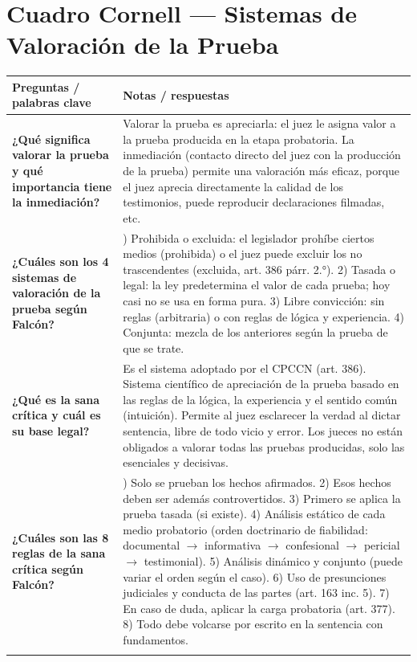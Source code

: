 \documentclass[12pt,oneside]{book}
\begin{document}
\section*{Cuadro Cornell --- Sistemas de Valoración de la Prueba}

\begin{table}[H]
\centering
\begin{tabularx}{\textwidth}{
    >{\raggedright\arraybackslash}p{}
    >{\raggedright\arraybackslash}X
}
\toprule
\textbf{Preguntas / palabras clave} & \textbf{Notas / respuestas} \\
\midrule

\textbf{¿Qué significa valorar la prueba y qué importancia tiene la inmediación?} &
Valorar la prueba es apreciarla: el juez le asigna valor a la prueba producida en la etapa probatoria. La inmediación (contacto directo del juez con la producción de la prueba) permite una valoración más eficaz, porque el juez aprecia directamente la calidad de los testimonios, puede reproducir declaraciones filmadas, etc. \\
\addlinespace

\textbf{¿Cuáles son los 4 sistemas de valoración de la prueba según Falcón?} &
1) Prohibida o excluida: el legislador prohíbe ciertos medios (prohibida) o el juez puede excluir los no trascendentes (excluida, art. 386 párr. 2.°). 2) Tasada o legal: la ley predetermina el valor de cada prueba; hoy casi no se usa en forma pura. 3) Libre convicción: sin reglas (arbitraria) o con reglas de lógica y experiencia. 4) Conjunta: mezcla de los anteriores según la prueba de que se trate. \\
\addlinespace

\textbf{¿Qué es la sana crítica y cuál es su base legal?} &
Es el sistema adoptado por el CPCCN (art. 386). Sistema científico de apreciación de la prueba basado en las reglas de la lógica, la experiencia y el sentido común (intuición). Permite al juez esclarecer la verdad al dictar sentencia, libre de todo vicio y error. Los jueces no están obligados a valorar todas las pruebas producidas, solo las esenciales y decisivas. \\
\addlinespace

\textbf{¿Cuáles son las 8 reglas de la sana crítica según Falcón?} &
1) Solo se prueban los hechos afirmados. 2) Esos hechos deben ser además controvertidos. 3) Primero se aplica la prueba tasada (si existe). 4) Análisis estático de cada medio probatorio (orden doctrinario de fiabilidad: documental $\to$ informativa $\to$ confesional $\to$ pericial $\to$ testimonial). 5) Análisis dinámico y conjunto (puede variar el orden según el caso). 6) Uso de presunciones judiciales y conducta de las partes (art. 163 inc. 5). 7) En caso de duda, aplicar la carga probatoria (art. 377). 8) Todo debe volcarse por escrito en la sentencia con fundamentos. \\
\addlinespace


\end{tabularx}
\end{table}
\end{document}
